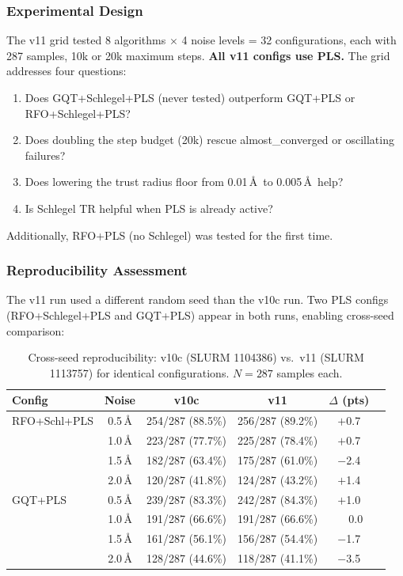 \documentclass[11pt,a4paper]{article}
\theoremstyle{definition}
\begin{document}
\subsubsection{Experimental Design}

The v11 grid tested 8 algorithms $\times$ 4 noise levels = 32 configurations,
each with 287 samples, 10k or 20k maximum steps.  \textbf{All v11 configs use
PLS.}  The grid addresses four questions:
\begin{enumerate}[nosep]
  \item Does GQT+Schlegel+PLS (never tested) outperform GQT+PLS or RFO+Schlegel+PLS?
  \item Does doubling the step budget (20k) rescue almost\_converged or oscillating failures?
  \item Does lowering the trust radius floor from 0.01\,\AA\ to 0.005\,\AA\ help?
  \item Is Schlegel TR helpful when PLS is already active?
\end{enumerate}
Additionally, RFO+PLS (no Schlegel) was tested for the first time.

\subsubsection{Reproducibility Assessment}
\label{sec:reproducibility}

The v11 run used a different random seed than the v10c run.  Two PLS
configs (RFO+Schlegel+PLS and GQT+PLS) appear in both runs, enabling
cross-seed comparison:

\begin{table}[h]
\centering
\caption{Cross-seed reproducibility: v10c (SLURM 1104386) vs.\ v11 (SLURM 1113757)
  for identical configurations.  $N=287$ samples each.}
\label{tab:reproducibility}
\begin{tabular}{lccccc}
\toprule
Config & Noise & v10c & v11 & $\Delta$ (pts) \\
\midrule
RFO+Schl+PLS & 0.5\,\AA & 254/287 (88.5\%) & 256/287 (89.2\%) & $+$0.7 \\
              & 1.0\,\AA & 223/287 (77.7\%) & 225/287 (78.4\%) & $+$0.7 \\
              & 1.5\,\AA & 182/287 (63.4\%) & 175/287 (61.0\%) & $-$2.4 \\
              & 2.0\,\AA & 120/287 (41.8\%) & 124/287 (43.2\%) & $+$1.4 \\
\midrule
GQT+PLS      & 0.5\,\AA & 239/287 (83.3\%) & 242/287 (84.3\%) & $+$1.0 \\
              & 1.0\,\AA & 191/287 (66.6\%) & 191/287 (66.6\%) & $\phantom{+}$0.0 \\
              & 1.5\,\AA & 161/287 (56.1\%) & 156/287 (54.4\%) & $-$1.7 \\
              & 2.0\,\AA & 128/287 (44.6\%) & 118/287 (41.1\%) & $-$3.5 \\
\bottomrule
\end{tabular}
\end{table}
\end{document}
